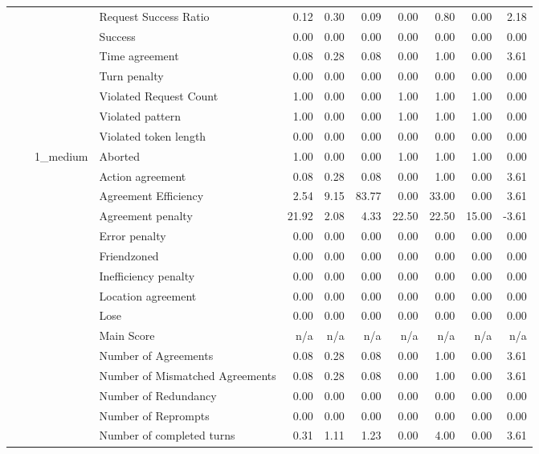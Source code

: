 \begin{tabular}{llllrrrrrrr}
 &  &  & Request Success Ratio & 0.12 & 0.30 & 0.09 & 0.00 & 0.80 & 0.00 & 2.18 \\
 &  &  & Success & 0.00 & 0.00 & 0.00 & 0.00 & 0.00 & 0.00 & 0.00 \\
 &  &  & Time agreement & 0.08 & 0.28 & 0.08 & 0.00 & 1.00 & 0.00 & 3.61 \\
 &  &  & Turn penalty & 0.00 & 0.00 & 0.00 & 0.00 & 0.00 & 0.00 & 0.00 \\
 &  &  & Violated Request Count & 1.00 & 0.00 & 0.00 & 1.00 & 1.00 & 1.00 & 0.00 \\
 &  &  & Violated pattern & 1.00 & 0.00 & 0.00 & 1.00 & 1.00 & 1.00 & 0.00 \\
 &  &  & Violated token length & 0.00 & 0.00 & 0.00 & 0.00 & 0.00 & 0.00 & 0.00 \\
\cline{3-11}
 &  & \multirow[t]{27}{*}{1_medium} & Aborted & 1.00 & 0.00 & 0.00 & 1.00 & 1.00 & 1.00 & 0.00 \\
 &  &  & Action agreement & 0.08 & 0.28 & 0.08 & 0.00 & 1.00 & 0.00 & 3.61 \\
 &  &  & Agreement Efficiency & 2.54 & 9.15 & 83.77 & 0.00 & 33.00 & 0.00 & 3.61 \\
 &  &  & Agreement penalty & 21.92 & 2.08 & 4.33 & 22.50 & 22.50 & 15.00 & -3.61 \\
 &  &  & Error penalty & 0.00 & 0.00 & 0.00 & 0.00 & 0.00 & 0.00 & 0.00 \\
 &  &  & Friendzoned & 0.00 & 0.00 & 0.00 & 0.00 & 0.00 & 0.00 & 0.00 \\
 &  &  & Inefficiency penalty & 0.00 & 0.00 & 0.00 & 0.00 & 0.00 & 0.00 & 0.00 \\
 &  &  & Location agreement & 0.00 & 0.00 & 0.00 & 0.00 & 0.00 & 0.00 & 0.00 \\
 &  &  & Lose & 0.00 & 0.00 & 0.00 & 0.00 & 0.00 & 0.00 & 0.00 \\
 &  &  & Main Score & n/a & n/a & n/a & n/a & n/a & n/a & n/a \\
 &  &  & Number of Agreements & 0.08 & 0.28 & 0.08 & 0.00 & 1.00 & 0.00 & 3.61 \\
 &  &  & Number of Mismatched Agreements & 0.08 & 0.28 & 0.08 & 0.00 & 1.00 & 0.00 & 3.61 \\
 &  &  & Number of Redundancy & 0.00 & 0.00 & 0.00 & 0.00 & 0.00 & 0.00 & 0.00 \\
 &  &  & Number of Reprompts & 0.00 & 0.00 & 0.00 & 0.00 & 0.00 & 0.00 & 0.00 \\
 &  &  & Number of completed turns & 0.31 & 1.11 & 1.23 & 0.00 & 4.00 & 0.00 & 3.61 \\

\end{tabular}
